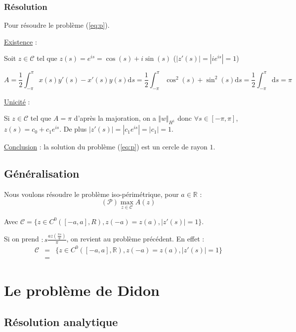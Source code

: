\documentclass[10pt,a4paper]{article}
\newcommand{\R}{\mathbb{R}}
\renewcommand{\d}{\mathrm{d}}
\theoremstyle{plain}
\theoremstyle{definition}
\begin{document}
\subsubsection{Résolution}

Pour résoudre le problème (\ref{eq:p}).

\underline{Existence} :

Soit $z \in \mathcal{C}$ tel que $z(s)=e^{is} = \cos(s)+i\sin(s)$ ($|z'(s)|=|ie^{is}|=1$)

\[ A = \frac{1}{2} \int_{-\pi}^{\pi}{ x(s)y'(s) - x'(s)y(s) \d s } = \frac{1}{2} \int_{-\pi}^{\pi}{ \cos^2(s) + \sin^2(s) \d s } = \frac{1}{2} \int_{-\pi}^{\pi}{ \d s } = \pi \]

\underline{Unicité} :

Si $z \in \mathcal{C}$ tel que $A=\pi$ d'après la majoration, on a $\Vert w\Vert_{H^1}$ donc $\forall s\in [-\pi,\pi]$, $z(s) = c_0+c_1e^{is}$. De plus $|z'(s)|=|c_1e^{is}| = |c_1| = 1$.


\underline{Conclusion} : la solution du problème (\ref{eq:p}) est un cercle de rayon $1$. 

\subsection{Généralisation}

Nous voulons résoudre le problème iso-périmétrique, pour $a\in \R$ :
\[ (\mathcal{P}) \max_{z \in \mathcal{C}} A(z) \]

Avec $\mathcal{C} = \{ z \in C^0([-a,a], R), z(-a)=z(a), |z'(s)|=1 \}$.

Si on prend $ : s\frac{a z(\frac{\pi s}{a})}{\pi}$, on revient au problème précédent. En effet :
\begin{eqnarray}
\mathcal{C} &=& \{ z \in C^0([-a,a], \R), z(-a)=z(a), |z'(s)|=1 \} \\
&=& 
\end{eqnarray}







\section{Le problème de Didon}
\label{sec:didon}

\subsection{Résolution analytique}
\end{document}
